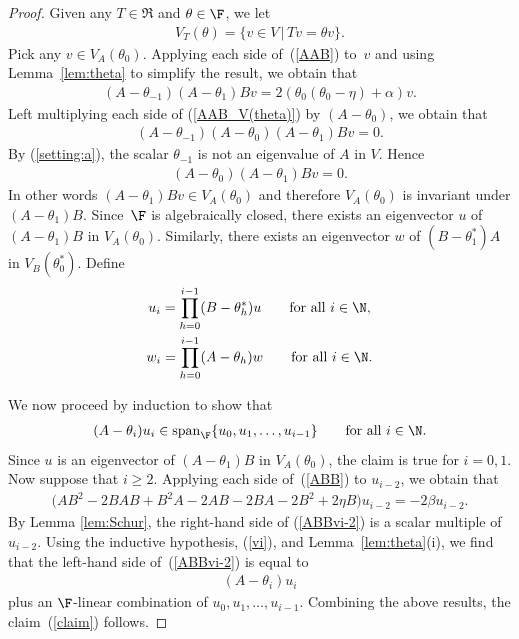 \begin{proof}
Given any $T\in \Re$ and $\theta\in \F$, we let
\begin{gather*}
V_T(\theta)=\{v\in V\,|\, Tv=\theta v\}.
\end{gather*}
Pick any $v\in V_A(\theta_0)$. Applying each side of~(\ref{AAB}) to~$v$ and using Lemma~\ref{lem:theta} to simplify the result, we obtain that
\begin{gather}\label{AAB_V(theta)}
(A-\theta_{-1})(A-\theta_1) B v=2(\theta_0(\theta_0-\eta)+\alpha)v.
\end{gather}
Left multiplying each side of (\ref{AAB_V(theta)}) by $(A-\theta_0)$, we obtain that
\begin{gather*}
(A-\theta_{-1})(A-\theta_0)(A-\theta_1) B v=0.
\end{gather*}
By (\ref{setting:a}), the scalar $\theta_{-1}$ is not an eigenvalue of $A$ in $V$. Hence
\begin{gather*}
(A-\theta_0)(A-\theta_1) B v=0.
\end{gather*}
In other words $(A-\theta_1) B v\in V_A(\theta_0)$ and therefore $V_A(\theta_0)$ is invariant under $(A-\theta_1) B$. Since~$\F$ is algebraically closed, there exists an eigenvector $u$ of $(A-\theta_1) B$ in $V_A(\theta_0)$. Similarly, there exists an eigenvector $w$ of $(B-\theta_1^*)A$ in $V_B(\theta_0^*)$. Define
\begin{gather}
u_i=\prod_{h=0}^{i-1} (B-\theta_h^*) u \qquad \hbox{for all $i\in \N$},\label{vi}\\
w_i=\prod_{h=0}^{i-1} (A-\theta_h) w\qquad \hbox{for all $i\in \N$}. \label{wi}
\end{gather}

We now proceed by induction to show that
\begin{gather}\label{claim}
(A-\theta_i)u_i\in \operatorname{span}_\F\{u_0,u_1,\ldots,u_{i-1}\} \qquad \hbox{for all $i\in \N$}.
\end{gather}
Since $u$ is an eigenvector of $(A-\theta_1) B$ in $V_A(\theta_0)$, the claim is true for $i=0,1$.
Now suppose that $i\geq 2$. Applying each side of~(\ref{ABB}) to $u_{i-2}$, we obtain that
\begin{gather}\label{ABBvi-2}
\big(A B^2 -2 BAB +B^2 A - 2 A B-2 BA-2 B^2+2 \eta B\big) u_{i-2}=-2 \beta u_{i-2}.
\end{gather}
By Lemma \ref{lem:Schur}, the right-hand side of (\ref{ABBvi-2}) is a scalar multiple of~$u_{i-2}$. Using the inductive hypothesis, (\ref{vi}), and Lemma~\ref{lem:theta}(i), we find that the left-hand side of~(\ref{ABBvi-2}) is equal to
\begin{gather}\label{ABBvi-2:LH'}
(A-\theta_i) u_i
\end{gather}
plus an $\F$-linear combination of $u_0,u_1,\ldots,u_{i-1}$. Combining the above results, the claim~(\ref{claim}) follows.


\end{proof}
